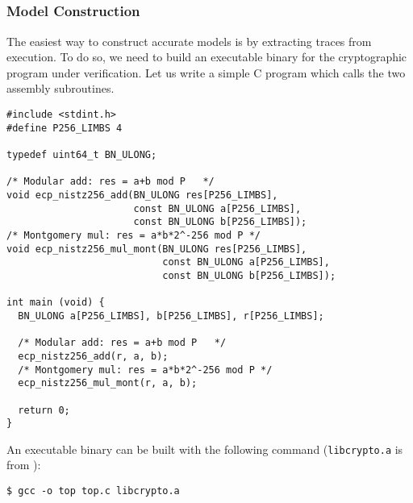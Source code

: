 \documentclass{amsproc}
\begin{document}
\subsection{\nistzadd}

\subsubsection{Model Construction}

The easiest way to construct accurate \cryptoline models is by
extracting traces from execution. To do so, we need to build an
executable binary for the cryptographic program under
verification. Let us write a simple C program which calls the two
assembly subroutines.
\begin{verbatim}
#include <stdint.h>
#define P256_LIMBS 4

typedef uint64_t BN_ULONG;

/* Modular add: res = a+b mod P   */
void ecp_nistz256_add(BN_ULONG res[P256_LIMBS],
                      const BN_ULONG a[P256_LIMBS],
                      const BN_ULONG b[P256_LIMBS]);
/* Montgomery mul: res = a*b*2^-256 mod P */
void ecp_nistz256_mul_mont(BN_ULONG res[P256_LIMBS],
                           const BN_ULONG a[P256_LIMBS],
                           const BN_ULONG b[P256_LIMBS]);

int main (void) {
  BN_ULONG a[P256_LIMBS], b[P256_LIMBS], r[P256_LIMBS];
  
  /* Modular add: res = a+b mod P   */
  ecp_nistz256_add(r, a, b);
  /* Montgomery mul: res = a*b*2^-256 mod P */
  ecp_nistz256_mul_mont(r, a, b);

  return 0;
}
\end{verbatim}

An executable binary can be built with the following command
(\texttt{libcrypto.a} is from \openssl):
\begin{verbatim}
$ gcc -o top top.c libcrypto.a
\end{verbatim}
\end{document}
